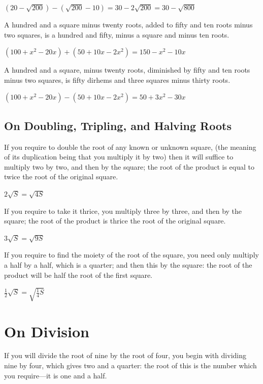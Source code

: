 \documentclass[11pt,a4paper]{book}
\begin{document}
$(20 - \sqrt{200}) - (\sqrt{200} - 10) = 30 - 2\sqrt{200} = 30 - \sqrt{800}$

A hundred and a square minus twenty roots, added to fifty and ten roots minus
two squares, is a hundred and fifty, minus a square and minus ten roots.

$(100 + x^2 - 20x) + (50 + 10x - 2x^2) = 150 - x^2 - 10x$

A hundred and a square, minus twenty roots, diminished by fifty and ten roots
minus two squares, is fifty dirhems and three squares minus thirty roots.

$(100 + x^2 - 20x) - (50 + 10x - 2x^2) = 50 + 3x^2 - 30x$

\section{On Doubling, Tripling, and Halving Roots}

If you require to double the root of any known or unknown square, (the
meaning of its duplication being that you multiply it by two) then it will
suffice to multiply two by two, and then by the square; the root of the
product is equal to twice the root of the original square.

$2\sqrt{S} = \sqrt{4S}$

If you require to take it thrice, you multiply three by three, and then by
the square; the root of the product is thrice the root of the original
square.

$3\sqrt{S} = \sqrt{9S}$

If you require to find the moiety of the root of the square, you need only
multiply a half by a half, which is a quarter; and then this by the square:
the root of the product will be half the root of the first square.

$\tfrac{1}{2}\sqrt{S} = \sqrt{\tfrac{1}{4}S}$

\newpage

\chapter{On Division}
\label{ch:division}

If you will divide the root of nine by the root of four, you begin with
dividing nine by four, which gives two and a quarter: the root of this is the
number which you require---it is one and a half.
\end{document}
